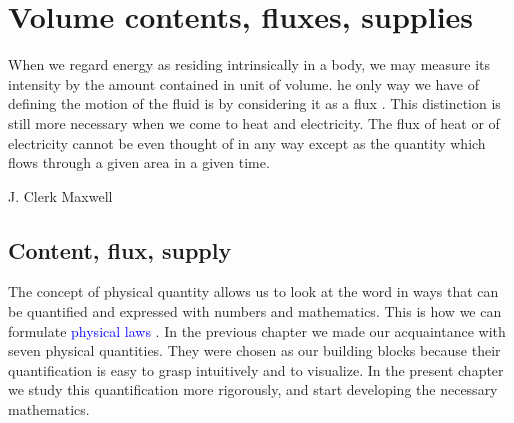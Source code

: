 \documentclass[a4paper,12pt,%
onecolumn,oneside,%
british%
]{memoir}
\newcommand{\mynotew}[1]{{\footnotesize\color{midgrey}\faIcon{tools}\ #1}}
\renewcommand*{\|}[1][]{\nonscript\:#1\vert\nonscript\:\mathopen{}}
\newcommand*{\sect}{\S}%
\renewcommand*{\autoref}[3][\sect\,\ref]{\textcolor{blue}{#3}
\raisebox{0.6ex}{\color{blue}\miniscule%
\faIcon{angle-right}%
\;#1{#2}\;p.\,\pageref{#2}}}
\begin{document}
\printpagenotes*
\cleartooddpage
\chapter{Volume contents, fluxes, supplies}
\label{cha:contents_fluxes}


\epigraph{%
When we regard energy as residing intrinsically in a body, we may measure its intensity by the amount contained in unit of volume. he only way we have of defining the motion of the fluid is by considering it as a flux \textelp{}. %
  This distinction is still more necessary when we come to heat and electricity. The flux of heat or of electricity cannot be even thought of in any way except as the quantity which flows through a given area in a given time.%
}{J. Clerk Maxwell \cites*{maxwell1869}}





\section{Content, flux, supply}
\label{sec:contentflux}

The concept of physical quantity allows us to look at the word in ways that can be quantified and expressed with numbers and mathematics. This is how we can formulate \autoref{sec:phys_laws0}{physical laws}. In the previous chapter we made our acquaintance with seven physical quantities. They were chosen as our building blocks because their quantification is easy to grasp intuitively and to visualize. In the present chapter we study this quantification more rigorously, and start developing the necessary mathematics.
\end{document}
